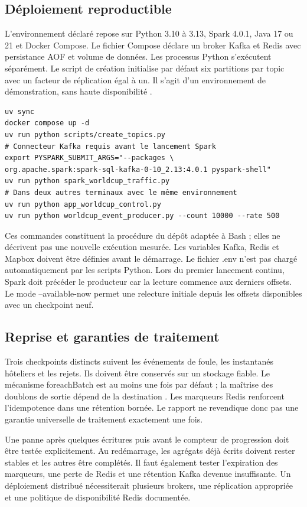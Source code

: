 \documentclass[a4paper,11pt]{article}
\begin{document}
\subsection{Déploiement reproductible}
L'environnement déclaré repose sur Python 3.10 à 3.13, Spark 4.0.1, Java 17 ou 21 et Docker Compose. Le fichier Compose déclare un broker Kafka et Redis avec persistance AOF et volume de données. Les processus Python s'exécutent séparément. Le script de création initialise par défaut six partitions par topic avec un facteur de réplication égal à un. Il s'agit d'un environnement de démonstration, sans haute disponibilité \cite{ref2}.
\par
\begin{Verbatim}[fontsize=\footnotesize,baselinestretch=1.05]
uv sync
docker compose up -d
uv run python scripts/create_topics.py
# Connecteur Kafka requis avant le lancement Spark
export PYSPARK_SUBMIT_ARGS="--packages \
org.apache.spark:spark-sql-kafka-0-10_2.13:4.0.1 pyspark-shell"
uv run python spark_worldcup_traffic.py
# Dans deux autres terminaux avec le même environnement
uv run python app_worldcup_control.py
uv run python worldcup_event_producer.py --count 10000 --rate 500
\end{Verbatim}
Ces commandes constituent la procédure du dépôt adaptée à Bash ; elles ne décrivent pas une nouvelle exécution mesurée. Les variables Kafka, Redis et Mapbox doivent être définies avant le démarrage. Le fichier .env n'est pas chargé automatiquement par les scripts Python. Lors du premier lancement continu, Spark doit précéder le producteur car la lecture commence aux derniers offsets. Le mode {\small\ttfamily --available-now} permet une relecture initiale depuis les offsets disponibles avec un checkpoint neuf.
\par
\subsection{Reprise et garanties de traitement}
Trois checkpoints distincts suivent les événements de foule, les instantanés hôteliers et les rejets. Ils doivent être conservés sur un stockage fiable. Le mécanisme {\small\ttfamily foreachBatch} est au moins une fois par défaut ; la maîtrise des doublons de sortie dépend de la destination \cite{ref4}. Les marqueurs Redis renforcent l'idempotence dans une rétention bornée. Le rapport ne revendique donc pas une garantie universelle de traitement exactement une fois.
\par
Une panne après quelques écritures puis avant le compteur de progression doit être testée explicitement. Au redémarrage, les agrégats déjà écrits doivent rester stables et les autres être complétés. Il faut également tester l'expiration des marqueurs, une perte de Redis et une rétention Kafka devenue insuffisante. Un déploiement distribué nécessiterait plusieurs brokers, une réplication appropriée et une politique de disponibilité Redis documentée.
\par
\end{document}
